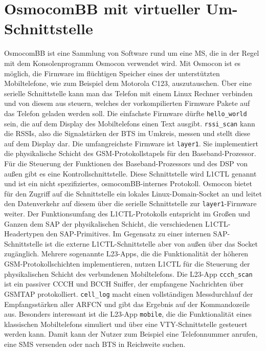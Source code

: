 \section{OsmocomBB mit virtueller Um-Schnittstelle}

OsmocomBB ist eine Sammlung von Software rund um eine \ac{MS}, die in der Regel mit dem Konsolenprogramm Osmocon verwendet wird. Mit Osmocon ist es möglich, die Firmware im flüchtigen Speicher eines der unterstützten Mobiltelefone, wie zum Beispiel dem Motorola C123, auszutauschen. Über eine serielle Schnittstelle kann man das Telefon mit einem Linux Rechner verbinden und von diesem aus steuern, welches der vorkompilierten Firmware Pakete auf das Telefon geladen werden soll. Die einfachste Firmware dürfte \texttt{hello\_world} sein, die auf dem Display des Mobiltelefons einen Text ausgibt. \texttt{rssi\_scan} kann die \acp{RSSI}, also die Signalstärken der \ac{BTS} im Umkreis, messen und stellt diese auf dem Display dar. Die umfangreichste Firmware ist \texttt{layer1}. Sie implementiert die physikalische Schicht des \ac{GSM}-Protokollstapels für den Baseband-Prozessor. Für die Steuerung der Funktionen des Baseband-Prozessors und des \ac{DSP} von außen gibt es eine Kontrollschnittstelle. Diese Schnittstelle wird \ac{L1CTL} genannt und ist ein nicht spezifiziertes, osmocomBB-internes Protokoll. Osmocon bietet für den Zugriff auf die Schnittstelle ein lokales Linux-Domain-Socket an und leitet den Datenverkehr auf diesem über die serielle Schnittstelle zur \texttt{layer1}-Firmware weiter. Der Funktionsumfang des \ac{L1CTL}-Protokolls entspricht im Großen und Ganzen dem \ac{SAP} der physikalischen Schicht, die verschiedenen \ac{L1CTL}-Headertypen den \ac{SAP}-Primitives. Im Gegensatz zu einer internen \ac{SAP}-Schnittstelle ist die externe \ac{L1CTL}-Schnittstelle aber von außen über das Socket zugänglich. Mehrere sogenannte L23-Apps, die die Funktionalität der höheren \ac{GSM}-Protokollschichten implementieren, nutzen \ac{L1CTL} für die Steuerung der physikalischen Schicht des verbundenen Mobiltelefons. Die L23-App \texttt{ccch\_scan} ist ein passiver \ac{CCCH} und \ac{BCCH} Sniffer, der empfangene Nachrichten über \ac{GSMTAP} protokolliert. \texttt{cell\_log} macht einen vollständigen Messdurchlauf der Empfangsstärken aller \ac{ARFCN} und gibt das Ergebnis auf der Kommandozeile aus. Besonders interessant ist die L23-App \texttt{mobile}, die die Funktionalität eines klassischen Mobiltelefons simuliert und über eine \ac{VTY}-Schnittstelle gesteuert werden kann. Damit kann der Nutzer zum Beispiel eine Telefonnummer anrufen, eine \ac{SMS} versenden oder nach \ac{BTS} in Reichweite suchen. 

